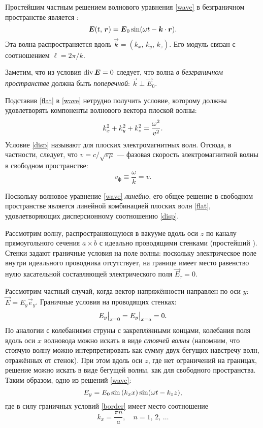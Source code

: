 Простейшим частным решением волнового уравнения \eqref{wave} в безграничном пространстве 
является :
\begin{equation} \eqmark{flat}
\vec{E}(t,\,\vec{r}) = \vec{E}_{0} \sin(\omega t - \vec{k}\cdot\vec{r}).
\end{equation}
Эта волна распространяется вдоль  $\vec{k}=(k_x,\,k_y,\,k_z)$.
Его модуль связан с  соотношением $\ell=2\pi/k$.

Заметим, что из условия $\mathop{\mathrm{div}} {\boldsymbol{E}}=0$ следует, что волна \emph{в безграничном
пространстве} должна быть \emph{поперечной}: $\vec{k} \perp \vec{E}_0$. 

Подставив \eqref{flat} в
\eqref{wave} нетрудно получить условие, которому должны удовлетворять компоненты
волнового вектора плоской волны:
\begin{equation} \eqmark{disp}
k_x^2 + k_y^2 + k_z^2 = \frac{\omega^2}{v^2}.
\end{equation}
Условие \eqref{disp} называют  для
плоских электромагнитных волн. Отсюда, в частности, следует, что
$v=c/\sqrt{\varepsilon\mu}$ --- фазовая скорость электромагнитной 
волны в свободном пространстве:
\[
v_{ф} \equiv \frac{\omega}{k} = v.
\]

Поскольку волновое уравнение \eqref{wave} \emph{линейно}, его общее решение 
в свободном пространстве является линейной комбинацией плоских
волн \eqref{flat}, удовлетворяющих дисперсионному соотношению \eqref{disp}.


Рассмотрим волну, распространяющуюся в вакууме вдоль оси $z$ по каналу 
прямоугольного сечения $a\times b$ с идеально проводящими стенками 
(простейший ).
Стенки задают граничные условия на поле волны:
поскольку электрическое поле внутри идеального проводника отсутствует,
на границе имеет место равенство нулю касательной составляющей
электрического поля $\vec{E}_{\tau} = 0$. 

Рассмотрим частный случай, когда вектор напряжённости направлен 
по оси $y$: $\vec{E} = E_y \vec{e}_y$. Граничные условия на проводящих стенках:
\begin{equation} \eqmark{border}
E_y\big|_{x=0} = E_y\big|_{x=a} = 0.
\end{equation}
По аналогии с колебаниями струны с закреплёнными концами, 
колебания поля вдоль оси $x$ волновода можно искать в виде \emph{стоячей волны}
(напомним, что стоячую волну можно интерпретировать как сумму двух
бегущих навстречу волн, отражённых от стенок). При этом вдоль оси $z$, 
где нет ограничений на границах,
решение можно искать в виде бегущей волны, как для свободного пространства.
Таким образом, одно из решений \eqref{wave}:
\begin{equation}
\eqmark{2.0.1} E_y=E_0 \sin\left(k_x x\right)\sin(\omega t-k_z z),
\end{equation} 
где в силу граничных условий \eqref{border} имеет место соотношение
\[
k_x = \frac{\pi n}{a},\quad n=1,\,2,\,\ldots
\]

